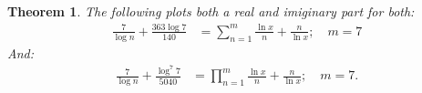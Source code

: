 \documentclass[10pt]{article}
\theoremstyle{plain}
\newtheorem{theorem}{Theorem}[section]
\theoremstyle{definition}
\theoremstyle{remark}
\begin{document}
\begin{theorem}
	The following plots both a real and imiginary part for both:
	\begin{align*}
		\frac{7}{\log n} + \frac{363 \log 7}{140} &= \sum_{n=1}^{m} \frac{\ln x}{n} + \frac{n}{\ln x}; \quad m = 7
	\end{align*}
	And:
	\begin{align*}
		\frac{7}{\log n} + \frac{\log^{7} 7}{5040} &= \prod_{n=1}^{m} \frac{\ln x}{n} + \frac{n}{\ln x}; \quad m = 7.
	\end{align*}
\end{theorem}

\nocite{*}


\end{document}

